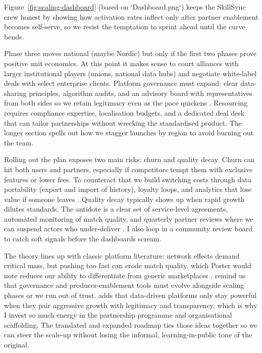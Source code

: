 Figure~\ref{fig:scaling-dashboard} (based on `Dashboard.png`) keeps the SkillSync crew honest by showing how activation rates inflect only after partner enablement becomes self-serve, so we resist the temptation to sprint ahead until the curve bends.

Phase three moves national (maybe Nordic) but only if the first two phases prove positive unit economics. At this point it makes sense to court alliances with larger institutional players (unions, national data hubs) and negotiate white-label deals with select enterprise clients. Platform governance must expand: clear data-sharing principles, algorithm audits, and an advisory board with representatives from both sides so we retain legitimacy even as the pace quickens \citep{Srnicek2017,Zuboff2019}. Resourcing requires compliance expertise, localisation budgets, and a dedicated deal desk that can tailor partnerships without wrecking the standardised product. The longer section spells out how we stagger launches by region to avoid burning out the team.

Rolling out the plan exposes two main risks: churn and quality decay. Churn can hit both users and partners, especially if competitors tempt them with exclusive features or lower fees. To counteract that we build switching costs through data portability (export and import of history), loyalty loops, and analytics that lose value if someone leaves \citep{FarrellSaloner1986,ShapiroVarian1999}. Quality decay typically shows up when rapid growth dilutes standards. The antidote is a clear set of service-level agreements, automated monitoring of match quality, and quarterly partner reviews where we can suspend actors who under-deliver \citep{Reillier2017}. I also loop in a community review board to catch soft signals before the dashboards scream.

The theory lines up with classic platform literature: network effects demand critical mass, but pushing too fast can erode match quality, which Porter would note reduces our ability to differentiate from generic marketplaces \citep{Porter2008}. \citet{Choudary2016} remind us that governance and producer-enablement tools must evolve alongside scaling phases or we run out of trust. \citet{Srnicek2017} adds that data-driven platforms only stay powerful when they pair aggressive growth with legitimacy and transparency, which is why I invest so much energy in the partnership programme and organisational scaffolding. The translated and expanded roadmap ties those ideas together so we can steer the scale-up without losing the informal, learning-in-public tone of the original.

